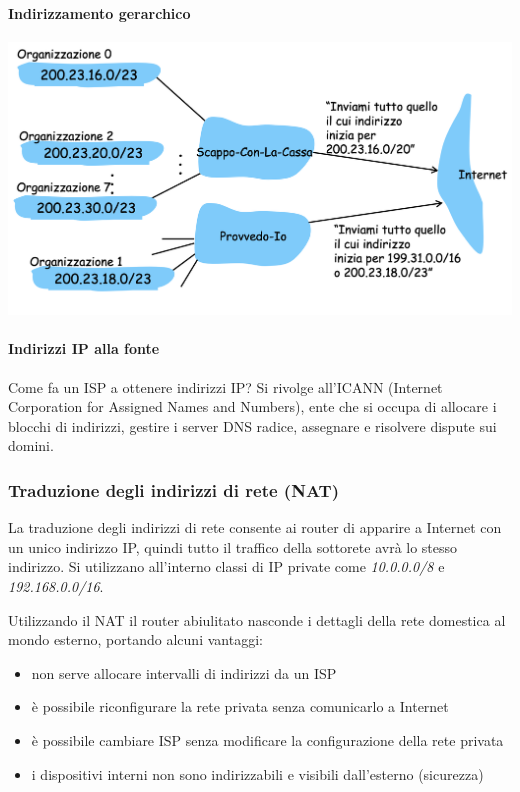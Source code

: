 \documentclass{report}
\begin{document}
\hypertarget{header-n115}{%
\paragraph{Indirizzamento gerarchico}\label{header-n115}}

\begin{center}
		\includegraphics[width=0.7\linewidth]{ind-gerarchico}
	\end{center}

\hypertarget{header-n117}{%
\paragraph{Indirizzi IP alla fonte}\label{header-n117}}

Come fa un ISP a ottenere indirizzi IP? Si rivolge all'ICANN (Internet
Corporation for Assigned Names and Numbers), ente che si occupa di
allocare i blocchi di indirizzi, gestire i server DNS radice, assegnare
e risolvere dispute sui domini.

\hypertarget{header-n119}{%
\subsubsection{Traduzione degli indirizzi di rete
(NAT)}\label{header-n119}}

La traduzione degli indirizzi di rete consente ai router di apparire a
Internet con un unico indirizzo IP, quindi tutto il traffico della
sottorete avrà lo stesso indirizzo. Si utilizzano all'interno classi di
IP private come \emph{10.0.0.0/8} e \emph{192.168.0.0/16}.

Utilizzando il NAT il router abiulitato nasconde i dettagli della rete
domestica al mondo esterno, portando alcuni vantaggi:

\begin{itemize}
\item
  non serve allocare intervalli di indirizzi da un ISP
\item
  è possibile riconfigurare la rete privata senza comunicarlo a Internet
\item
  è possibile cambiare ISP senza modificare la configurazione della rete
  privata
\item
  i dispositivi interni non sono indirizzabili e visibili dall'esterno
  (sicurezza)
\end{itemize}
\end{document}
